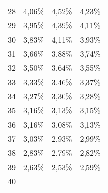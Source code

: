 \begin{tabular}{llll}
\multicolumn{1}{l}{\hspace{1em}28} &
  \multicolumn{1}{|r}{4,06\%} &
  \multicolumn{1}{r}{4,52\%} &
  \multicolumn{1}{r}{4,23\%} \\
\multicolumn{1}{l}{\hspace{1em}29} &
  \multicolumn{1}{|r}{3,95\%} &
  \multicolumn{1}{r}{4,39\%} &
  \multicolumn{1}{r}{4,11\%} \\
\multicolumn{1}{l}{\hspace{1em}30} &
  \multicolumn{1}{|r}{3,83\%} &
  \multicolumn{1}{r}{4,11\%} &
  \multicolumn{1}{r}{3,93\%} \\
\multicolumn{1}{l}{\hspace{1em}31} &
  \multicolumn{1}{|r}{3,66\%} &
  \multicolumn{1}{r}{3,88\%} &
  \multicolumn{1}{r}{3,74\%} \\
\multicolumn{1}{l}{\hspace{1em}32} &
  \multicolumn{1}{|r}{3,50\%} &
  \multicolumn{1}{r}{3,64\%} &
  \multicolumn{1}{r}{3,55\%} \\
\multicolumn{1}{l}{\hspace{1em}33} &
  \multicolumn{1}{|r}{3,33\%} &
  \multicolumn{1}{r}{3,46\%} &
  \multicolumn{1}{r}{3,37\%} \\
\multicolumn{1}{l}{\hspace{1em}34} &
  \multicolumn{1}{|r}{3,27\%} &
  \multicolumn{1}{r}{3,30\%} &
  \multicolumn{1}{r}{3,28\%} \\
\multicolumn{1}{l}{\hspace{1em}35} &
  \multicolumn{1}{|r}{3,16\%} &
  \multicolumn{1}{r}{3,13\%} &
  \multicolumn{1}{r}{3,15\%} \\
\multicolumn{1}{l}{\hspace{1em}36} &
  \multicolumn{1}{|r}{3,16\%} &
  \multicolumn{1}{r}{3,08\%} &
  \multicolumn{1}{r}{3,13\%} \\
\multicolumn{1}{l}{\hspace{1em}37} &
  \multicolumn{1}{|r}{3,03\%} &
  \multicolumn{1}{r}{2,93\%} &
  \multicolumn{1}{r}{2,99\%} \\
\multicolumn{1}{l}{\hspace{1em}38} &
  \multicolumn{1}{|r}{2,83\%} &
  \multicolumn{1}{r}{2,79\%} &
  \multicolumn{1}{r}{2,82\%} \\
\multicolumn{1}{l}{\hspace{1em}39} &
  \multicolumn{1}{|r}{2,63\%} &
  \multicolumn{1}{r}{2,53\%} &
  \multicolumn{1}{r}{2,59\%} \\
\multicolumn{1}{l}{\hspace{1em}40} &

\end{tabular}
